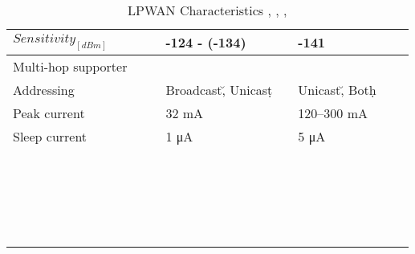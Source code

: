 \begin{longtable}{l|l|l|l|l|l|l|l}
	$Sensitivity_{[dBm]}$                &                  &              & -124 - (-134)          &               & -141                                   &                   & \\\hline
	Multi-hop supporter                  &                  &              & \ko                    &               & \ko                                    &                   & \\\hline
	Addressing                           &                  &              & Broadcast\u, Unicast\d &               & Unicast\u, Both\d                      &                   & \\\hline
	Peak current                         &                  &              & 32 mA                  &               & 120–300 mA                             &                   & \\\hline
	Sleep current                        &                  &              & 1 μA                   &               & 5 μA                                   &                   & \\\hline
	\                                    &                  &              &                        &               &                                        &                   & \\\hline
	\                                    &                  &              &                        &               &                                        &                   & \\\hline
	\                                    &                  &              &                        &               &                                        &                   & \\\hline
	\                                    &                  &              &                        &               &                                        &                   & \\\hline

\caption{\label{tab:LPWan_characteristics} LPWAN Characteristics \cite{al-kashoash_comparison_2016}, \cite{lopes_design_2019}, \cite{raza_low_22}, \cite{ayoub_internet_2019}}
\end{longtable}

\clearpage
\newpage


